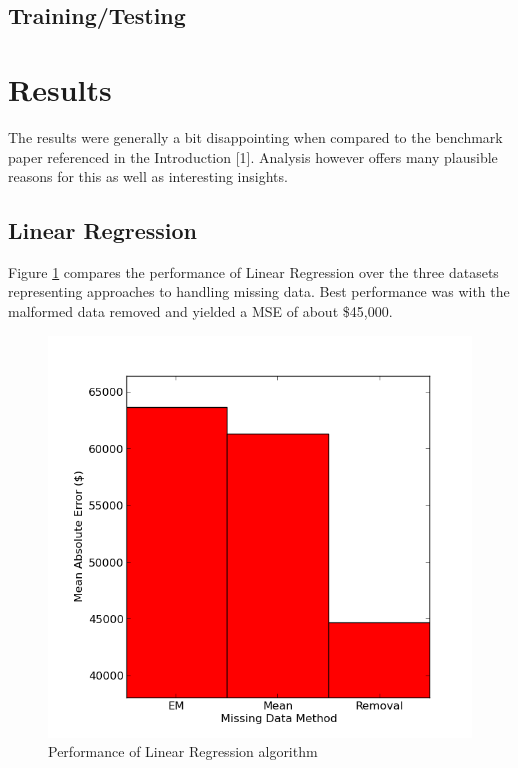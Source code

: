 \documentclass{acm_proc_article-sp}
\begin{document}
\subsection{Training/Testing}


\section{Results}
	 The results were generally a bit disappointing when compared to the benchmark paper referenced in the Introduction [1]. Analysis however offers many plausible reasons for this as well as interesting insights. 
	 
\subsection{Linear Regression}
	Figure \ref{fig:linreg} compares the performance of Linear Regression over the three datasets representing approaches to handling missing data. Best performance was with the malformed data removed and yielded a MSE of about \$45,000.
	 
	 \begin{figure}[!htbp]
   		\centering
  		\includegraphics[width=\linewidth]{linear_regression_tuning.png}
    		\caption{Performance of Linear Regression algorithm}
    		\label{fig:linreg}
	\end{figure}
	
\end{document}
